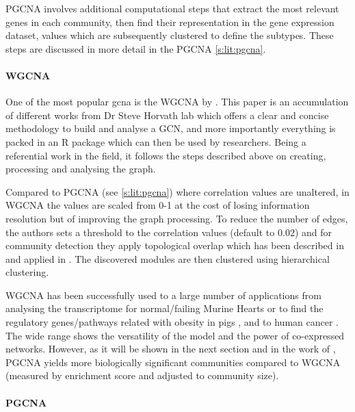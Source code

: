 \gls{PGCNA} involves additional computational steps that extract the most relevant genes in each community, then find their representation in the gene expression dataset, values which are subsequently clustered to define the subtypes. These steps are discussed in more detail in the PGCNA \cref{s:lit:pgcna}.


\paragraph*{WGCNA} \label{s:lit:WGCNA}

One of the most popular \acrfull{gcna} is the WGCNA by \citet{Langfelder2008-sn}. This paper is an accumulation of different works from Dr Steve Horvath lab which offers a clear and concise methodology to build and analyse a GCN, and more importantly everything is packed in an R package which can then be used by researchers. Being a referential work in the field, it follows the steps described above on creating, processing and analysing the graph.

Compared to PGCNA (see \cref{s:lit:pgcna}) where correlation values are unaltered, in WGCNA the values are scaled from 0-1 at the cost of losing information resolution but of improving the graph processing. To reduce the number of edges, the authors sets a threshold to the correlation values (default to $0.02$) and for community detection they apply topological overlap which has been described in \cite{Zhang2005-xq} and applied in \citep{Yip2007-mr, Li2007-vz, Ravasz2002-au}. The discovered modules are then clustered using hierarchical clustering.

\gls{WGCNA} has been successfully used to a large number of applications from analysing the transcriptome for normal/failing Murine Hearts \citep{Lee2011-wm} or to find the regulatory genes/pathways related with obesity in pigs \citep{Kogelman2014-ea}, and to human cancer \citep{Yang2014-wv, Clarke2013-wd, Care2019-ij}. The wide range shows the versatility of the model and the power of co-expressed networks. However, as it will be shown in the next section and in the work of \citet{Care2019-ij}, PGCNA yields more biologically significant communities compared to WGCNA (measured by enrichment score and adjusted to community size).

\paragraph*{PGCNA} \label{s:lit:pgcna}

